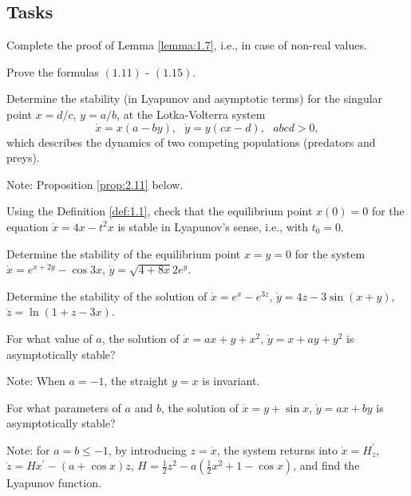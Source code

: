 \subsection*{Tasks}
\begin{task}
	Complete the proof of Lemma \ref{lemma:1.7}, i.e., in case of non-real values.
\end{task}
\begin{task}
	Prove the formulas $(1.11)$ - $(1.15)$.
\end{task}
\begin{task}
	Determine the stability (in Lyapunov and asymptotic terms) for the singular point $ x = d / c $, $ y = a / b $, at the Lotka-Volterra system
	\begin{equation}
	\label{1.33}
	\dot{x}=x(a-by),\text{ \ \ }\dot{y}=y(cx-d),\text{ \ \ }abcd>0,
	\end{equation}
	which describes the dynamics of two competing populations (predators and preys).
	
	Note: Proposition \ref{prop:2.11} below.
\end{task}
\begin{task}
	Using the Definition \ref{def:1.1}, check that the equilibrium point $ x (0) = 0 $ for the equation $ \dot {x} = 4x-t ^ {2} x $ is stable in Lyapunov's sense, i.e., with $ t_ {0} = 0 $.
\end{task}
\begin{task}
	Determine the stability of the equilibrium point $ x = y = 0 $ for the system $ \dot {x} = e ^ {x + 2y} - \cos 3x $, $ \dot {y} = \sqrt {4 + 8x} 2e^ {y} $.
\end{task}
\begin{task}
	Determine the stability of the solution of $ \dot {x} = e ^ {x} -e ^ {3z} $, $ \dot {y} = 4z-3 \sin (x + y) $,  $ \dot { z} = \ln (1 + z-3x) $.
\end{task}
\begin{task}
	For what value of $ a $, the solution of $ \dot {x} = ax + y + x ^ {2} $, $ \dot {y} = x + ay + y ^ {2} $ is asymptotically stable?
	
	Note: When $ a = -1 $, the straight $ y = x $ is invariant.
\end{task}
\begin{task}
	For what parameters of $ a $ and $ b $, the solution of $\dot{x}=y+\sin x$, $\dot{y}=ax+by$ is asymptotically stable?
	
	Note: for $ a = b \leq -1 $, by introducing $ z = \dot {x} $, the system returns into $ \dot {x} = H_ {z} ^ {\prime} $, $ \dot {z} = {H} {x} ^ {\prime} - (a + \cos x) z$, $H=\frac{1}{2}z^{2}-a(\frac{1}{2}x^{2}+1-\cos x)$, and find the Lyapunov function.
\end{task}
